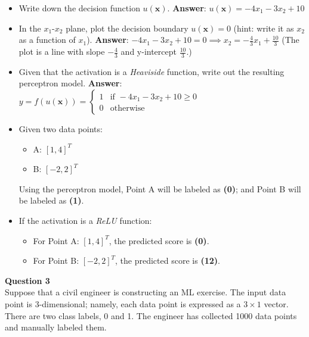 \documentclass[12pt]{article}
\begin{document}
\begin{itemize}
    \item Write down the decision function \( u(\bm{x}) \).  
    \textbf{Answer}: \( u(\bm{x}) = -4x_1 - 3x_2 + 10 \)
    \item In the \(x_1\text{-}x_2\) plane, plot the decision boundary \( u(\bm{x}) = 0 \) (hint: write it as \(x_2\) as a function of \(x_1\)).  
    \textbf{Answer}: \( -4x_1 - 3x_2 + 10 = 0 \implies x_2 = -\frac{4}{3}x_1 + \frac{10}{3} \)  
    (The plot is a line with slope \(-\frac{4}{3}\) and y-intercept \(\frac{10}{3}\).)
    \item Given that the activation is a \textit{Heaviside} function, write out the resulting perceptron model.  
    \textbf{Answer}: \( y = f(u(\bm{x})) = \begin{cases} 1 & \text{if } -4x_1 - 3x_2 + 10 \geq 0 \\ 0 & \text{otherwise} \end{cases} \)
    \item Given two data points:
    \begin{itemize}
        \item A: \([1, 4]^T\)
        \item B: \([-2, 2]^T\)
    \end{itemize}
    Using the perceptron model, Point A will be labeled as \textbf{(0)}; and Point B will be labeled as \textbf{(1)}.
    \item If the activation is a \textit{ReLU} function:
    \begin{itemize}
        \item For Point A: \([1, 4]^T\), the predicted score is \textbf{(0)}.
        \item For Point B: \([-2, 2]^T\), the predicted score is \textbf{(12)}.
    \end{itemize}
\end{itemize}

\bigskip

\newpage

\textbf{Question 3} \\

Suppose that a civil engineer is constructing an ML exercise. The input data point is 3-dimensional; namely, each data point is expressed as a \(3\times 1\) vector. There are two class labels, 0 and 1. The engineer has collected 1000 data points and manually labeled them.
\end{document}
